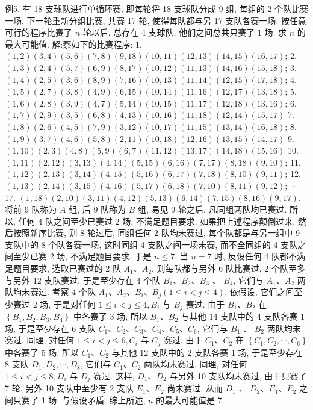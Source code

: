 例5. 有 18 支球队进行单循环赛, 即每轮将 18 支球队分成 9 组, 每组的 2 个队比赛一场.
下一轮重新分组比赛, 共赛 17 轮, 使得每队都与另 17 支队各赛一场.
按任意可行的程序比赛了 $n$ 轮以后, 总存在 4 支球队, 他们之间总共只赛了 1 场.
求 $n$ 的最大可能值.
解:察如下的比赛程序:
1. $(1,2)(3,4)(5,6)(7,8)(9,18)(10,11)(12,13)(14,15) (16,17)$;
2. $(1,3)(2,4)(5,7)(6,9)(8,17)(10,12)(11,13)(14,16) (15,18)$;
3. $(1,4)(2,5)(3,6)(8,9)(7,16)(10,13)(11,14)(12,15) (17,18)$;
4. $(1,5)(2,7)(3,8)(4,9)(6,15)(10,14)(11,16)(12,17) (13,18)$;
5. $(1,6)(2,8)(3,9)(4,7)(5,14)(10,15)(11,17)(12,18) (13,16)$;
6. $(1,7)(2,9)(3,5)(6,8)(4,13)(10,16)(11,18)(12,14) (15,17)$
7. $(1,8)(2,6)(4,5)(7,9)(3,12)(10,17)(11,15)(13,14) (16,18)$;
8. $(1,9)(3,7)(4,6)(5,8)(2,11)(10,18)(12,16)(13,15) (14,17)$
9. $(1,10)(2,3)(4,8)(5,9)(6,7)(11,12)(13,17)(14,18) (15,16)$
10. $(1,11)(2,12)(3,13)(4,14)(5,15)(6,16)(7,17)(8,18) (9,10)$;
11. $(1,12)(2,13)(3,14)(4,15)(5,16)(6,17)(7,18)(8,10) (9,11)$;
12. $(1,13)(2,14)(3,15)(4,16)(5,17)(6,18)(7,10)(8,11) (9,12)$;
$\cdots$
17. $(1,18)(2,10)(3,11)(4,12)(5,13)(6,14)(7,15)(8,16) (9,17)$.
将前 9 队称为 $A$ 组, 后 9 队称为 $B$ 组, 易见 9 轮之后, 凡同组两队均已赛过.
所以, 任何 4 队之间至少已赛过 2 场, 不满足题目要求.
如果把上述程序颠倒过来, 然后按照新序比赛, 则 8 轮过后, 同组任何 2 队均未赛过, 每个队都是与另一组中 9 支队中的 8 个队各赛一场, 这时同组 4 支队之间一场未赛, 而不全同组的 4 支队之间至少已赛 2 场, 不满足题目要求.
于是 $n \leqslant 7$. 当 $n=7$ 时, 反设任何 4 队都不满足题目要求, 选取已赛过的 2 队 $A_1 、 A_2$, 则每队都与另外 6 队比赛过, 2 个队至多与另外 12 支队赛过, 于是至少存在 4 个队 $B_1 、 B_2 、 B_3$ 、 $B_4$, 它们与 $A_1 、 A_2$ 两队均未赛过.
考察 4 个队 $A_1 、 A_2 、 B_i 、 B_j(1 \leqslant i<j \leqslant 4)$, 依假设, 它们之间至少赛过 2 场, 于是对任何 $1 \leqslant i<j \leqslant 4, B_i$ 与 $B_j$ 赛过.
由于 $B_1 、 B_2$ 在 $\left\{B_1, B_2, B_3, B_4\right\}$ 中各赛了 3 场, 所以 $B_1 、 B_2$ 与其他 14 支队中的 4 支队各赛 1 场, 于是至少存在 6 支队 $C_1 、 C_2 、 C_3 、 C_4 、 C_5 、 C_6$, 它们与 $B_1$ 、 $B_2$ 两队均未赛过.
同理, 对任何 $1 \leqslant i<j \leqslant 6, C_i$ 与 $C_j$ 赛过.
由于 $C_1 、 C_2$ 在 $\left\{C_1, C_2, \cdots, C_6\right\}$ 中各赛了 5 场, 所以 $C_1 、 C_2$ 与其他 12 支队中的 2 支队各赛 1 场, 于是至少存在 8 支队 $D_1, D_2, \cdots, D_8$, 它们与 $C_1 、 C_2$ 两队均未赛过.
同理, 对任何 $1 \leqslant i<j \leqslant 8, D_i$ 与 $D_j$ 赛过.
这样, $D_1 、 D_2$ 与另外 10 支队均未赛过, 由于只赛了 7 轮, 另外 10 支队中至少有 2 支队 $E_1 、 E_2$ 尚未赛过, 从而 $D_1$ 、 $D_2 、 E_1 、 E_2$ 之间只赛了 1 场, 与假设矛盾.
综上所述, $n$ 的最大可能值是 7 .



